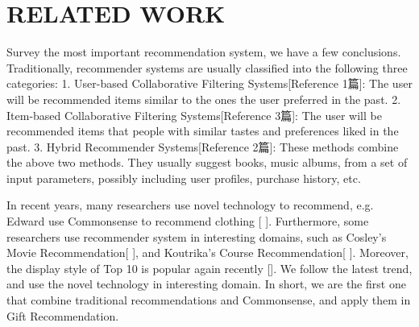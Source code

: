 \documentclass[11pt,twocolumn]{article}
\begin{document}


\section{RELATED WORK}
Survey the most important recommendation system, we have a few conclusions.
Traditionally, recommender systems are usually classified into the following three categories: 
1. User-based Collaborative Filtering Systems[Reference 1篇]:
The user will be recommended items similar to the ones the user preferred in the past.
2. Item-based Collaborative Filtering Systems[Reference 3篇]:
The user will be recommended items that people with similar tastes and preferences liked in the past.
3. Hybrid Recommender Systems[Reference 2篇]:
These methods combine the above two methods.
They usually suggest books, music albums, from a set of input parameters, possibly including user profiles, purchase history, etc.

In recent years, many researchers use novel technology to recommend, e.g. Edward use Commonsense to recommend clothing [ ].   Furthermore, some researchers use recommender system in interesting domains, such as Cosley’s Movie Recommendation[ ], and Koutrika’s Course Recommendation[ ].   Moreover, the display style of Top 10 is popular again recently []. We follow the latest trend, and use the novel technology in interesting domain.   In short, we are the first one that combine traditional recommendations and Commonsense, and apply them in Gift Recommendation.
\end{document}
